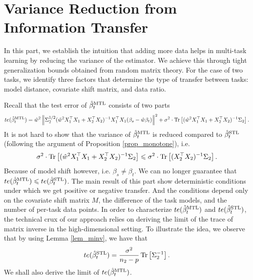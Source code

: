 \section{Variance Reduction from Information Transfer}\label{sec_denoise}

In this part, we establish the intuition that adding more data helps in multi-task learning by reducing the variance of the estimator.
We achieve this through tight generalization bounds obtained from random matrix theory.
For the case of two tasks, we identify three factors that determine the type of transfer between tasks: model distance, covariate shift matrix, and data ratio.

Recall that the test error of $\hat{\beta}_{t}^{\text{MTL}}$ consists of two parts
\begin{align}
	te(\hat{\beta}_t^{\text{MTL}}) = \hat{w}^2 \left\| \Sigma_2^{1/2} (\hat{w}^2 X_1^{\top}X_1 + X_2^{\top}X_2)^{-1}X_1^{\top}X_1 (\beta_s - \hat{w}\beta_t) \right\|^2 + \sigma^2\cdot \operatorname{Tr}\left[(\hat{w}^2 X_1^{\top}X_1 + X_2^{\top}X_2)^{-1}\Sigma_2\right]. \label{eq_te_model_shift}
\end{align}
It is not hard to show that the variance of $\hat{\beta}_t^{\text{MTL}}$ is reduced compared to $\hat{\beta}_t^{\text{STL}}$ (following the argument of Proposition \ref{prop_monotone}), i.e.
\[ \sigma^2\cdot \operatorname{Tr}\left[(\hat{w}^2 X_1^{\top}X_1 + X_2^{\top}X_2)^{-1}\Sigma_2\right] \leqslant \sigma^2\cdot \operatorname{Tr}\left[(X_2^{\top}X_2)^{-1}\Sigma_2\right]. \]
Because of model shift however, i.e. $\beta_s \neq \beta_t$.
We can no longer guarantee that $te(\hat{\beta}_{t}^{\text{MTL}}) \leqslant te(\hat{\beta}_t^{\text{STL}})$.
The main result of this part show deterministic conditions under which we get positive or negative transfer.
And the conditions depend only on the covariate shift matrix $M$, the difference of the task models, and the number of per-task data points.
In order to characterize $te(\hat{\beta}_t^{\text{MTL}})$ and $te(\hat{\beta}_t^{\text{STL}})$, the technical crux of our approach relies on deriving the limit of the trace of matrix inverse in the high-dimensional setting.
To illustrate the idea, we observe that by using Lemma \ref{lem_minv}, we have that
\[ te(\hat{\beta}_t^{\text{STL}}) = \frac{\sigma^2}{n_2 - p}\operatorname{Tr}\left[\Sigma_2^{-1}\right]. \]
We shall also derive the limit of $te(\hat{\beta}_t^{\text{MTL}})$.


